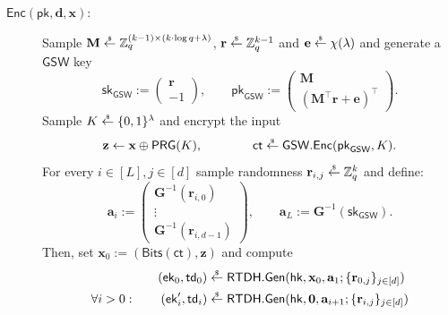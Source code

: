 \documentclass{article}
\newcommand{\ek}{\mathsf{ek}}
\newcommand{\td}{\mathsf{td}}
\newcommand{\getsr}{\overset{\raisebox{-1pt}{$\scriptscriptstyle \$$}}{\gets}}
\newcommand{\sample}{\getsr}
\newcommand{\Z}{\mathbb{Z}}
\renewcommand{\sec}{\ensuremath{\lambda}}
\newcommand{\ct}{\mathsf{ct}}
\newcommand{\RTDH}{\mathsf{RTDH}}
\newcommand{\BV}{\mathsf{GSW}}
\newcommand{\algofont}[1]{\ensuremath{\mathsf{#1}}}
\newcommand{\Enc}{{\algofont{Enc}}}
\newcommand{\Gen}{{\algofont{Gen}}}
\newcommand{\pk}{{\mathsf{pk}}}
\newcommand{\sk}{{\mathsf{sk}}}
\newcommand{\hk}{\ensuremath{\mathsf{hk}}}
\newenvironment{protocol}[1][]
{\begin{algorithm}\caption{#1}}
  {\end{algorithm}}
\begin{document}
\begin{protocol}[Rate-1 Adaptive LFE for Bounded-Depth Circuits (to be continued)]
\begin{description}
\item[$\Enc(\pk, \mathbf{d}, \mathbf{x})$:] Sample $\mathbf{M}\sample\Z_q^{(k-1)\times (k\cdot \log q+\sec)}$, $\mathbf{r}\sample\Z_q^{k-1}$ and $\mathbf{e}\sample\chi(\sec)$ and generate a $\BV$ key 
\[
\sk_\BV:=\begin{pmatrix}
\mathbf r\\
-1
\end{pmatrix},
\qquad
\pk_\BV:=\begin{pmatrix}
\mathbf M\\
(\mathbf M^\intercal \mathbf r+\mathbf e)^\intercal
\end{pmatrix}.
\]
Sample $K\sample\{0, 1\}^\sec$ and encrypt the input 
\[\mathbf{z}\gets \mathbf{x}\oplus\mathsf{PRG}(K),\qquad\qquad \ct\sample\BV.\Enc(\pk_\BV, K).\]
 For every $i\in[L], j\in[d]$ sample randomness $\mathbf{r}_{i, j}\sample\Z_q^k$ and define:
\[
\mathbf{a}_i:=\begin{pmatrix}
\mathbf{G}^{-1}(\mathbf{r}_{i,0})\\
\vdots\\
\mathbf{G}^{-1}(\mathbf{r}_{i,d-1})
\end{pmatrix},
\qquad
\mathbf{a}_L:=\mathbf{G}^{-1}(\sk_\BV).
\]
Then, set $\mathbf{x}_0:=(\mathsf{Bits}(\ct), \mathbf{z})$ and compute
\begin{align*}(\ek_0, \td_0)&\sample\RTDH.\Gen(\hk, \mathbf{x}_0, \mathbf{a}_{1}; \{\mathbf{r}_{0, j}\}_{j\in[d]})\\
  \forall i>0:\qquad(\ek'_i, \td_i)&\sample\RTDH.\Gen(\hk, \mathbf{0}, \mathbf{a}_{i+1}; \{\mathbf{r}_{i, j}\}_{j\in[d]})
\end{align*}
\end{description}
\end{protocol}
\end{document}
